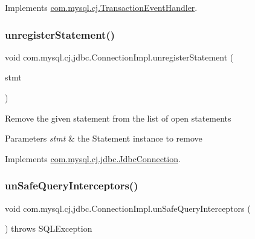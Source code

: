 Implements \mbox{\hyperlink{interfacecom_1_1mysql_1_1cj_1_1_transaction_event_handler_ac0775d70699a27ec6a8a7954e64b86f8}{com.\+mysql.\+cj.\+Transaction\+Event\+Handler}}.

\mbox{\label{classcom_1_1mysql_1_1cj_1_1jdbc_1_1_connection_impl_a5f86d22252d24d3b0ddf4cb2c7afd4b7}} 
\subsubsection{\texorpdfstring{unregister\+Statement()}{unregisterStatement()}}
{\footnotesize\ttfamily void com.\+mysql.\+cj.\+jdbc.\+Connection\+Impl.\+unregister\+Statement (\begin{DoxyParamCaption}\item[{\mbox{\hyperlink{interfacecom_1_1mysql_1_1cj_1_1jdbc_1_1_jdbc_statement}{Jdbc\+Statement}}}]{stmt }\end{DoxyParamCaption})}

Remove the given statement from the list of open statements


\begin{DoxyParams}{Parameters}
{\em stmt} & the Statement instance to remove \\
\hline
\end{DoxyParams}


Implements \mbox{\hyperlink{interfacecom_1_1mysql_1_1cj_1_1jdbc_1_1_jdbc_connection_aea0e19ebe576a318c72df2d72cc25c94}{com.\+mysql.\+cj.\+jdbc.\+Jdbc\+Connection}}.

\mbox{\label{classcom_1_1mysql_1_1cj_1_1jdbc_1_1_connection_impl_a2d9f577e4a6ccc254081ce8dfd9a3bd8}} 
\subsubsection{\texorpdfstring{un\+Safe\+Query\+Interceptors()}{unSafeQueryInterceptors()}}
{\footnotesize\ttfamily void com.\+mysql.\+cj.\+jdbc.\+Connection\+Impl.\+un\+Safe\+Query\+Interceptors (\begin{DoxyParamCaption}{ }\end{DoxyParamCaption}) throws S\+Q\+L\+Exception}



